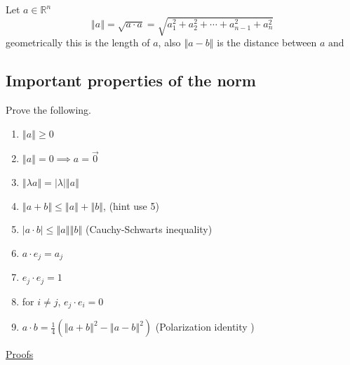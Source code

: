 \documentclass[11pt]{book}
\begin{document}
\begin{defn}[Norm]\label{defn:norm}
    Let $a \in \mathbb{R}^{n}  $ 
    \[
    \left\Vert a \right\Vert = \sqrt{a \cdot a} = \sqrt{a_{1}^2   +  a_{2}^2   +  \dotsb   +  a_{n - 1}^2   +  a_{n}^2  } 
    \]
    geometrically this is the length of $a$, also $\left\Vert a - b \right\Vert $ is the distance between $a \text{ and } $ 
\end{defn}



\subsection{Important properties of the norm}%
\label{sub:important_properties_of_the_norm}

Prove the following.
\begin{enumerate}
    \item $\left\Vert a \right\Vert \ge 0$ 
    \item $\left\Vert a \right\Vert = 0 \implies a = \vec{0} $ 
    \item $\left\Vert \lambda a \right\Vert = \left| \lambda  \right| \left\Vert a \right\Vert  $ 
    \item $\left\Vert a + b \right\Vert \le \left\Vert a \right\Vert  + \left\Vert b \right\Vert $, (hint use 5)
    \item $\left| a \cdot b \right| \le \left\Vert a \right\Vert \left\Vert b \right\Vert $ (Cauchy-Schwarts inequality)
    \item $a \cdot e_{j} = a_{j} $ 
    \item $e_{j}  \cdot e_{j} = 1$ 
    \item for $i\neq j$,  $e_{j}  \cdot e_{i} = 0$ 
    \item $a \cdot b = \frac{1}{4}\left( \left\Vert a + b \right\Vert ^2  - \left\Vert a - b \right\Vert ^2  \right) $ (Polarization identity )
\end{enumerate}

\underline{Proofs} 
\end{document}
